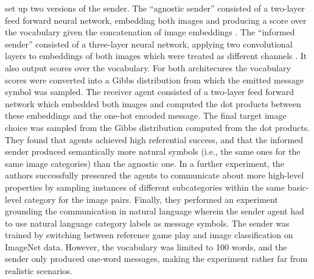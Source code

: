 \cite{lazaridou2016multi} set up two versions of the sender. The ``agnostic sender'' consisted of a two-layer feed forward neural network, embedding both images and producing a score over the vocabulary given the concatenation of image embeddings \parencite[][p. 3]{lazaridou2016multi}. The ``informed sender'' consisted of a three-layer neural network, applying two convolutional layers to embeddings of both images which were treated as different channels \parencite[][p. 3]{lazaridou2016multi}. It also output scores over the vocabulary. For both architecures the vocabulary scores were converted into a Gibbs distribution from which the emitted message symbol was sampled. The receiver agent consisted of a two-layer feed forward network which embedded both images and computed the dot products between these embeddings and the one-hot encoded message. The final target image choice was sampled from the Gibbs distribution computed from the dot products. %
They found that agents achieved high referential success, and that the informed sender produced semantically more natural symbols (i.e., the same ones for the same image categories) than the agnostic one. In a further experiment, the authors successfully pressured the agents to communicate about more high-level properties by sampling instances of different subcategories within the same basic-level category for the image pairs.%
Finally, they performed an experiment grounding the communication in natural language wherein the sender agent had to use natural language category labels as message symbols. The sender was trained by switching between reference game play and image classification on ImageNet data. However, the vocabulary was limited to 100 words, and the sender only produced one-word messages, making the experiment rather far from realistic scenarios. %
	
